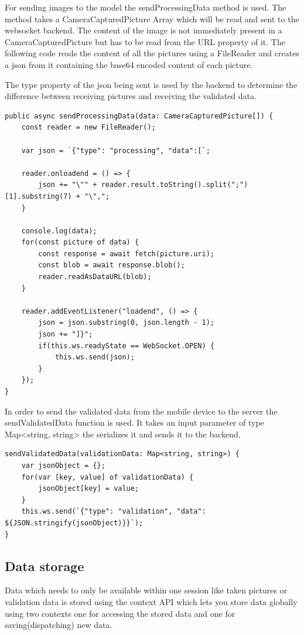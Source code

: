 For sending images to the model the sendProcessingData method is used.
The method takes a CameraCapturedPicture Array which will be read and sent to the websocket backend.
The content of the image is not immediately present in a CameraCapturedPicture but has to be read from the URL property of it.
The following code reads the content of all the pictures using a FileReader and creates a json from it containing the base64 encoded content of each picture.

The type property of the json being sent is used by the backend to determine the difference between receiving pictures and receiving the validated data.



\begin{lstlisting}[caption=Method for sending Pictures to backend,label=lst:impl:sendProcessingData]
public async sendProcessingData(data: CameraCapturedPicture[]) {
    const reader = new FileReader();

    var json = `{"type": "processing", "data":[`;

    reader.onloadend = () => {
        json += "\"" + reader.result.toString().split(";")[1].substring(7) + "\",";
    }

    console.log(data);
    for(const picture of data) {
        const response = await fetch(picture.uri);
        const blob = await response.blob();
        reader.readAsDataURL(blob);
    }

    reader.addEventListener("loadend", () => {
        json = json.substring(0, json.length - 1);
        json += "]}";
        if(this.ws.readyState == WebSocket.OPEN) {
            this.ws.send(json);
        }
    });
}
\end{lstlisting}

In order to send the validated data from the mobile device to the server the sendValidatedData function is used. It takes an input parameter of type Map<string, string> the serializes it and sends it to the backend.

\begin{lstlisting}[caption=Method for sending validated data to the backend,label=lst:impl:sendValidatedData]
sendValidatedData(validationData: Map<string, string>) {
    var jsonObject = {};
    for(var [key, value] of validationData) {
        jsonObject[key] = value;
    }
    this.ws.send(`{"type": "validation", "data": ${JSON.stringify(jsonObject)}}`);
}
\end{lstlisting}

\subsection{Data storage}
Data which needs to only be available within one session like taken pictures or validation data is stored using the context API which lets you store data globally using two contexts one for accessing the stored data and one for saving(dispatching) new data.

